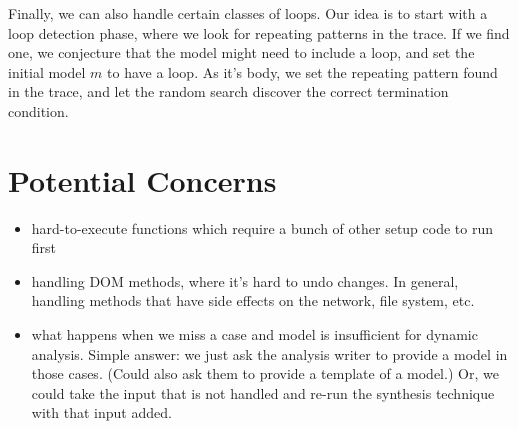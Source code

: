 \documentclass[]{article}
\begin{document}
Finally, we can also handle certain classes of loops.  Our idea is to start
with a loop detection phase, where we look for repeating patterns in the
trace.  If we find one, we conjecture that the model might need to include a
loop, and set the initial model $m$ to have a loop.  As it's body, we
set the repeating pattern found in the trace, and let the random search
discover the correct termination condition.



\section*{Potential Concerns}

\begin{itemize}
  \item hard-to-execute functions which require a bunch of other setup code to
  run first
  \item handling DOM methods, where it's hard to undo changes.  In general,
  handling methods that have side effects on the network, file system, etc.
  \item what happens when we miss a case and model is insufficient for dynamic
  analysis.  Simple answer: we just ask the analysis writer to provide a model in
  those cases.  (Could also ask them to provide a template of a model.)  Or, we
  could take the input that is not handled and re-run the synthesis technique with
  that input added.
\end{itemize}











% 
% 
\end{document}
